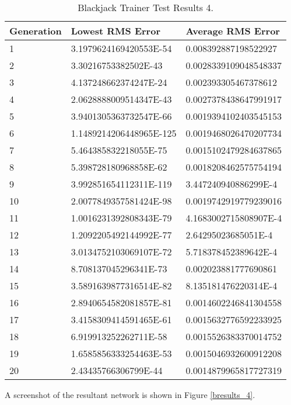 \begin{center}
    \begin{longtable}{ | l | l | l |}
      \caption{Blackjack Trainer Test Results 4.} \label{btr4} \\
   \hline
  Generation & Lowest RMS Error & Average RMS Error \\ \hline
1 &	3.1979624169420553E-54 &	0.008392887198522927 \\ \hline
2 &	3.30216753382502E-43 &	0.0028339109048548337 \\ \hline
3 &	4.137248662374247E-24 &	0.002393305467378612 \\ \hline
4 &	2.0628888009514347E-43 &	0.0027378438647991917 \\ \hline
5 &	3.9401305363732547E-66 &	0.0019394102403545153 \\ \hline
6 &	1.1489214206448965E-125 &	0.0019468026470207734 \\ \hline
7 &	5.464385832218055E-75 &	0.0015102479284637865 \\ \hline
8 &	5.398728180968858E-62 &	0.0018208462575754194 \\ \hline
9 &	3.992851654112311E-119 &	3.447240940886299E-4 \\ \hline
10 &	2.0077849357581424E-98 &	0.0019742919779239016 \\ \hline
11 &	1.0016231392808343E-79 &	4.1683002715808907E-4 \\ \hline
12 &	1.2092205492144992E-77 &	2.64295023685051E-4 \\ \hline
13 &	3.0134752103069107E-72 &	5.718378452389642E-4 \\ \hline
14 &	8.708137045296341E-73 &	0.002023881777690861 \\ \hline
15 &	3.5891639877316514E-82 &	8.135181476220314E-4 \\ \hline
16 &	2.8940654582081857E-81 &	0.0014602246841304558 \\ \hline
17 &	3.4158309414591465E-61 &	0.0015632776592233925 \\ \hline
18 &	6.919913252262711E-58 &	0.0015526383370014752 \\ \hline
19 &	1.6585856333254463E-53 &	0.0015046932600912208 \\ \hline
20 &	2.43435766306799E-44 &	0.0014879965817727319 \\ \hline
\end{longtable}
\end{center}

A screenshot of the resultant network is shown in Figure \ref{bresults_4}.


